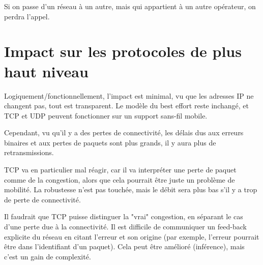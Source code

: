 	Si on passe d'un réseau à un autre, mais qui appartient à un autre opérateur, on perdra l'appel.
	
		
	\section{Impact sur les protocoles de plus haut niveau}
	
	Logiquement/fonctionnellement, l'impact est minimal, vu que les adresses IP ne changent pas, tout est transparent. Le modèle du best effort reste inchangé, et TCP et UDP peuvent fonctionner sur un support sans-fil mobile.
	
	Cependant, vu qu'il y a des pertes de connectivité, les délais dus aux erreurs binaires et aux pertes de paquets sont plus grands, il y aura plus de retransmissions.
	
	TCP va en particulier mal réagir, car il va interpréter une perte de paquet comme de la congestion, alors que cela pourrait être juste un problème de mobilité. La robustesse n'est pas touchée, mais le débit sera plus bas s'il y a trop de perte de connectivité.
	
	Il faudrait que TCP puisse distinguer la "vrai" congestion, en séparant le cas d'une perte due à la connectivité. Il est difficile de communiquer un feed-back explicite du réseau en citant l'erreur et son origine (par exemple, l'erreur pourrait être dans l'identifiant d'un paquet). Cela peut être amélioré (inférence), mais c'est un gain de complexité.
	
		
	
